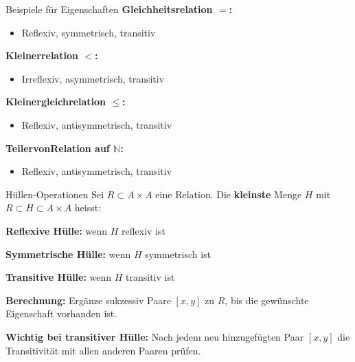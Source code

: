 \documentclass[a4paper, fontsize=7pt]{scrartcl}
\def\N{\mathbb{N}}  %
\begin{document}
\begin{subbox}{Beispiele f\"ur Eigenschaften}
\textbf{Gleichheitsrelation $=$:}
\begin{itemize}
    \item Reflexiv, symmetrisch, transitiv
\end{itemize}

\textbf{Kleinerrelation $<$:}
\begin{itemize}
    \item Irreflexiv, asymmetrisch, transitiv
\end{itemize}

\textbf{Kleinergleichrelation $\leq$:}
\begin{itemize}
    \item Reflexiv, antisymmetrisch, transitiv
\end{itemize}

\textbf{TeilervonRelation auf $\N$:}
\begin{itemize}
    \item Reflexiv, antisymmetrisch, transitiv
\end{itemize}
\end{subbox}

\begin{mainbox}{H\"ullen-Operationen}
Sei $R \subset A \times A$ eine Relation. Die \textbf{kleinste} Menge $H$ mit $R \subset H \subset A \times A$ heisst:

\textbf{Reflexive H\"ulle:} wenn $H$ reflexiv ist

\textbf{Symmetrische H\"ulle:} wenn $H$ symmetrisch ist

\textbf{Transitive H\"ulle:} wenn $H$ transitiv ist

\textbf{Berechnung:}
Erg\"anze sukzessiv Paare $[x, y]$ zu $R$, bis die gew\"unschte Eigenschaft vorhanden ist.

\textbf{Wichtig bei transitiver H\"ulle:}
Nach jedem neu hinzugef\"ugten Paar $[x, y]$ die Transitivit\"at mit allen anderen Paaren pr\"ufen.
\end{mainbox}
\end{document}
